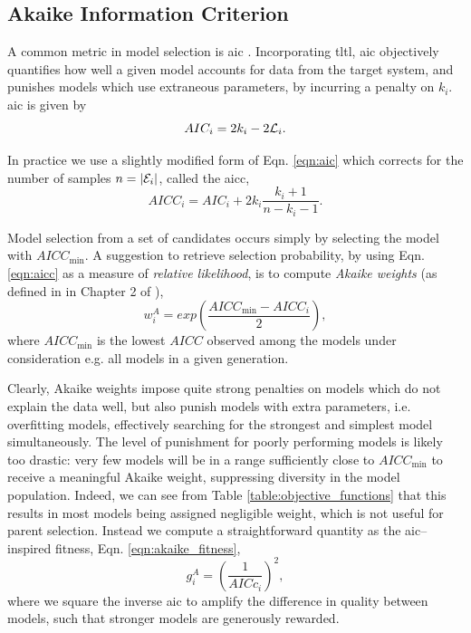 \subsection{Akaike Information Criterion}\label{sec:akaike_info_criterion}
A common metric in model selection is \gls{aic} \cite{dr2002model}.
Incorporating \gls{tltl}, 
    \gls{aic} objectively quantifies how well a given model accounts for data from the target system,
    and punishes models which use extraneous parameters, 
    by incurring a penalty on $k_i$. 
\gls{aic} is given by 
\begin{equation}
    \label{eqn:aic}
    AIC_i = 2k_i - 2 {\mathcal{L}}_{i}.
\end{equation}

In practice we use a slightly modified form of Eqn. \ref{eqn:aic} which
    corrects for the number of samples $n=\left|{ \mathcal{E} }_i\right|$, 
    called the \gls{aicc}, 
\begin{equation}
    \label{eqn:aicc}
    AICC_i = AIC_i + 2k_i \frac{k_i+1}{n-k_i-1}. 
\end{equation}

Model selection from a set of candidates occurs simply by selecting the model with $AICC_{\textrm{min}}$.
A suggestion to retrieve selection probability,
    by using Eqn. \ref{eqn:aicc} as a measure of \emph{relative likelihood},
    is to compute \emph{Akaike weights} (as defined in in Chapter 2 of \cite{dr2002model}),
\begin{equation}
    \label{eqn:akaike_weights}
    w_i^A = exp \left( \frac{{AICC_{\textrm{min}} - AICC_i}}{2} \right), 
\end{equation}
where $AICC_{\textrm{min}}$ is the lowest $AICC$ observed among the models under consideration
    e.g. all models in a given generation. 

Clearly, Akaike weights impose quite strong penalties 
    on models which do not explain the data well, 
    but also punish models with extra parameters, i.e. overfitting models, 
    effectively searching for the strongest and simplest model simultaneously.
The level of punishment for poorly performing models is likely too drastic: 
    very few models will be in a range sufficiently close to $AICC_{\textrm{min}}$ 
    to receive a meaningful Akaike weight, 
    suppressing diversity in the model population.
    Indeed, we can see from Table \ref{table:objective_functions} that this results in most 
    models being assigned negligible weight, which is not useful for parent selection. 
Instead we compute a straightforward quantity as the \gls{aic}--inspired fitness, Eqn. \ref{eqn:akaike_fitness},
\begin{equation}
    \label{eqn:akaike_fitness}
    g_i^{A} = \left(\frac{1}{AICc_i}\right)^2,
\end{equation}
    where we square the inverse \gls{aic} to amplify the difference in quality between models, 
    such that stronger models are generously rewarded.

